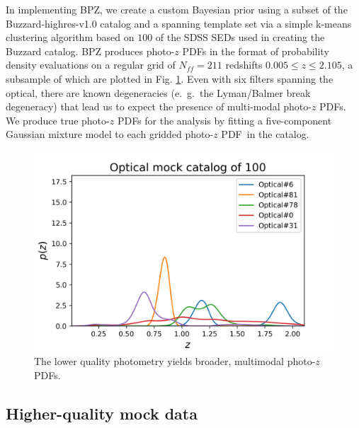 \documentclass[\docopts]{\docclass}
\newcommand{\pz}{photo-$z$ PDF}
\begin{document}
In implementing BPZ, we create a custom Bayesian prior using a subset of the 
Buzzard-highres-v1.0 catalog and a spanning template set via a simple k-means 
clustering algorithm based on $100$ of the SDSS SEDs used in creating the 
Buzzard catalog.  BPZ produces \pz s in the format of probability density 
evaluations on a regular grid of $N_{ff}=211$ redshifts $0.005\leq z\leq2.105$, 
a subsample of which are plotted in Fig. \ref{fig:lsst_pzs}.  Even with six 
filters spanning the optical, there are known degeneracies (e.~g.~the 
Lyman/Balmer break degeneracy) that lead us to expect the presence of 
multi-modal \pz s.  We produce true \pz s for the analysis by fitting a 
five-component Gaussian mixture model to each gridded \pz\ in the catalog.

\begin{figure}
  \includegraphics[width=0.9\columnwidth]{figures/lsst_pzs.png}
  \caption{The lower quality photometry yields broader, multimodal \pz s.
  \label{fig:lsst_pzs}}
\end{figure}

\subsection{Higher-quality mock data}
\label{sec:Euclid}
\end{document}
